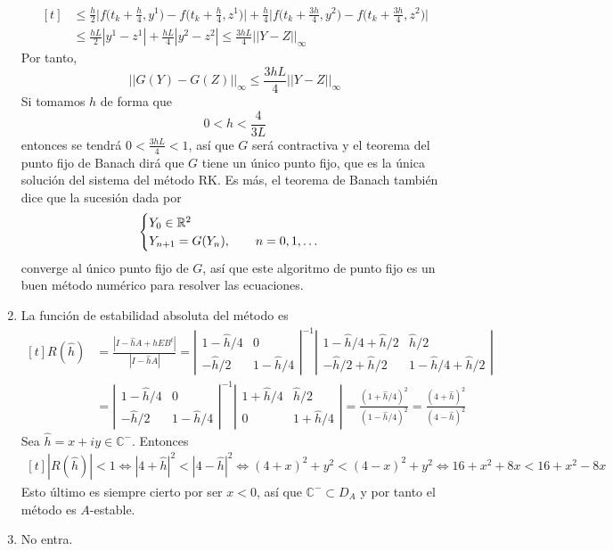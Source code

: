 \documentclass[11pt]{report}
\newcommand{\R}{\mathbb R}
\newcommand{\C}{\mathbb C}
\begin{document}
\begin{enumerate}
\[\begin{aligned}[t]
     &\leq \frac{h}{2}\bigl|f\bigl(t_k+\frac{h}{4},y^1\bigr)-f\bigl(t_k+\frac{h}{4},z^1\bigr)\bigr|+\frac{h}{4}\bigl|f\bigl(t_k+\frac{3h}{4},y^2\bigr)-f\bigl(t_k+\frac{3h}{4},z^2\bigr)\bigr| \\
     &\leq \frac{hL}{2}|y^1-z^1|+\frac{hL}{4}|y^2-z^2| \leq \frac{3hL}{4} ||Y-Z||_{\infty}
  \end{aligned}
  \]
  Por tanto,
  \[||G(Y)-G(Z)||_{\infty} \leq \frac{3hL}{4}||Y-Z||_\infty\]
  Si tomamos $h$ de forma que
  \[0<h<\frac{4}{3L}\]
  entonces se tendrá $0<\frac{3hL}{4}<1$, así que $G$ será contractiva y el teorema del punto fijo de Banach dirá que $G$ tiene un único punto fijo, que es la única solución del sistema del método RK. Es más, el teorema de Banach también dice que la sucesión dada por
  \[\begin{cases}
    Y_0 \in \R^2 \\
    Y_{n+1} = G(Y_n), \qquad n = 0,1,\mathellipsis
  \end{cases}\]
  converge al único punto fijo de $G$, así que este algoritmo de punto fijo es un buen método numérico para resolver las ecuaciones.
  \item La función de estabilidad absoluta del método es 
  \[\begin{aligned}[t]
    R(\hat{h}) &= \frac{|I-\hat{h}A+hEB^t|}{|I-\hat{h}A|} = \left|\begin{array}{cc}
      1 - \hat{h}/4 & 0 \\
      -\hat{h}/2 & 1-\hat{h}/4 
    \end{array} \right|^{-1}\left|\begin{array}{cc}
      1 - \hat{h}/4+\hat{h}/2 & \hat{h}/2 \\
      -\hat{h}/2+\hat{h}/2 & 1-\hat{h}/4 +\hat{h}/2
    \end{array}\right| \\ &= \left|\begin{array}{cc}
      1 - \hat{h}/4 & 0 \\
      -\hat{h}/2 & 1-\hat{h}/4 
    \end{array} \right|^{-1}\left|\begin{array}{cc}
      1 + \hat{h}/4 & \hat{h}/2 \\
      0 & 1+\hat{h}/4
    \end{array}\right| = \frac{(1+\hat{h}/4)^2}{(1-\hat{h}/4)^2} = \frac{(4+\hat{h})^2}{(4-\hat{h})^2}
  \end{aligned}  \]
  Sea $\hat{h}=x+iy \in \C^-$. Entonces
  \[\begin{aligned}[t]
      |R(\hat{h})| < 1 \iff |4+\hat{h}|^2 < |4-\hat{h}|^2 \iff (4+x)^2+y^2 < (4-x)^2+y^2 \iff 16+x^2+8x < 16+x^2-8x
  \end{aligned}\]
  Esto último es siempre cierto por ser $x<0$, así que $\C^- \subset D_A$ y por tanto el método es $A$-estable.
  \item No entra.
\end{enumerate}
\end{document}
